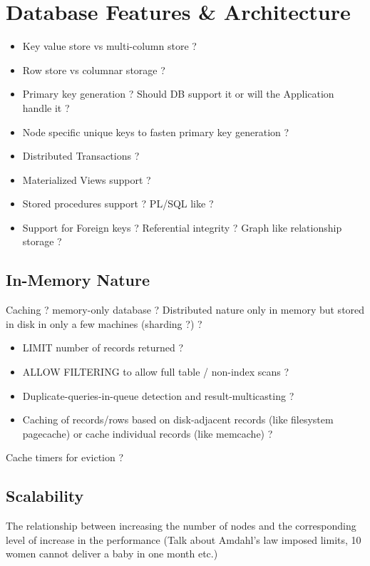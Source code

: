 \section{Database Features & Architecture}

\begin{itemize}
\item Key value store vs multi-column store ?
\end{itemize}
\begin{itemize}
\item Row store vs columnar storage ?
\end{itemize}
\begin{itemize}
\item Primary key generation ? Should DB support it or will the Application handle it ?
\end{itemize}
\begin{itemize}
\item Node specific unique keys to fasten primary key generation ?
\end{itemize}
\begin{itemize}
\item Distributed Transactions ?
\end{itemize}
\begin{itemize}
\item Materialized Views support ?
\end{itemize}
\begin{itemize}
\item Stored procedures support ? PL/SQL like ?
\end{itemize}
\begin{itemize}
\item Support for Foreign keys ? Referential integrity ? Graph like relationship storage ?
\end{itemize}

\subsection{In-Memory Nature}
Caching ?
memory-only database ?
Distributed nature only in memory but stored in disk in only a few machines (sharding ?) ?

\begin{itemize}
\item LIMIT number of records returned ?
\end{itemize}
\begin{itemize}
\item ALLOW FILTERING to allow full table / non-index scans ?
\end{itemize}
\begin{itemize}
\item Duplicate-queries-in-queue detection and result-multicasting ?
\end{itemize}
\begin{itemize}
\item Caching of records/rows based on disk-adjacent records (like filesystem pagecache) or cache individual records (like memcache) ?
\end{itemize}
Cache timers for eviction ?

\subsection{Scalability}
The relationship between increasing the number of nodes and the corresponding level of increase in the performance (Talk about Amdahl's law imposed limits, 10 women cannot deliver a baby in one month etc.)